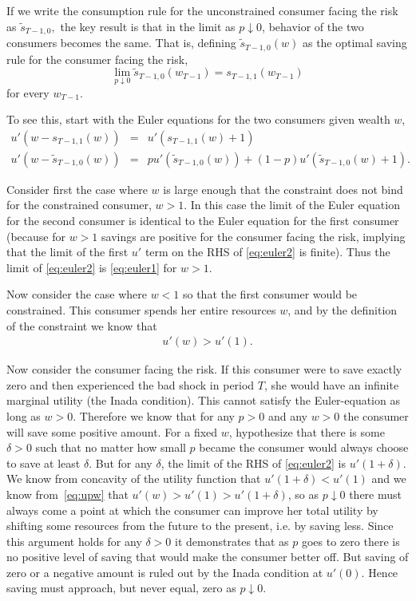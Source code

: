\documentclass[titlepage]{\econtex}
\begin{document}
  If we write the consumption rule for the unconstrained consumer facing the risk as $\tilde{s}_{T-1,0},$ the key result is that in the limit as $p \downarrow 0$, behavior of the two consumers becomes the same. That is, defining $\tilde{s}_{T-1,0}(w)$ as the optimal saving rule for the consumer facing the risk,
  \begin{equation*}
    \lim_{p \downarrow 0} \tilde{s}_{T-1,0}(w_{T-1}) = s_{T-1,1}(w_{T-1}) \label{eq:lim0}
  \end{equation*}
  for every $w_{T-1}$.

  To see this, start with the Euler equations for the two consumers given wealth $w$,
  \begin{eqnarray}
    u'(w-s_{T-1,1}(w)) & = & u'(s_{T-1,1}(w)+1) \label{eq:euler1}
    \\   u'(w-\tilde{s}_{T-1,0}(w)) & = & p u'(\tilde{s}_{T-1,0}(w))+(1-p) u'(\tilde{s}_{T-1,0}(w)+1). \label{eq:euler2}
  \end{eqnarray}

  Consider first the case where $w$ is large enough that the constraint does not bind for the constrained consumer, $w>1$.  In this case the limit of the Euler equation for the second consumer is identical to the Euler equation for the first consumer (because for $w>1$ savings are positive for the consumer facing the risk, implying that the limit of the first $u'$ term on the RHS of \eqref{eq:euler2} is finite). Thus the limit of \eqref{eq:euler2} is \eqref{eq:euler1} for $w>1$.

  Now consider the case where $w < 1$ so that the first consumer would be constrained.  This consumer spends her entire resources $w$, and by the definition of the constraint we know that 
  \begin{eqnarray}
    u'(w) > u'(1). \label{eq:upw}
  \end{eqnarray}

  Now consider the consumer facing the risk. If this consumer were to save exactly zero and then experienced the bad shock in period $T$, she would have an infinite marginal utility (the Inada condition). This cannot satisfy the Euler-equation as long as $w>0$. Therefore we know that for any $p>0$ and any $w>0$ the consumer will save some positive amount. For a fixed $w$, hypothesize that there is some $\delta>0$ such that no matter how small $p$ became the consumer would always choose to save at least $\delta$. But for any $\delta$, the limit of the RHS of \eqref{eq:euler2} is $u'(1+\delta)$. We know from concavity of the utility function that $u'(1+\delta) < u'(1)$ and we know from~\eqref{eq:upw} that $u'(w) > u'(1) > u'(1+\delta)$, so as $p \downarrow 0$ there must always come a point at which the consumer can improve her total utility by shifting some resources from the future to the present, i.e. by saving less.  Since this argument holds for any $\delta>0$ it demonstrates that as $p$ goes to zero there is no positive level of saving that would make the consumer better off. But saving of zero or a negative amount is ruled out by the Inada condition at $u'(0)$.  Hence saving must approach, but never equal, zero as $p \downarrow 0$.
\end{document}
